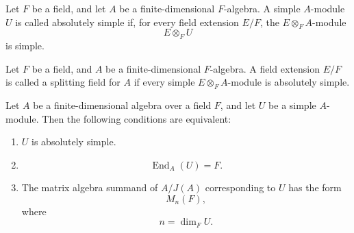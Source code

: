 \begin{definition}
    Let \(F\) be a field, and let \(A\) be a finite-dimensional \(F\)-algebra.
    A simple \(A\)-module \(U\) is called absolutely simple if, for every field
    extension \(E/F\), the \(E\otimes_F A\)-module
    \[
        E\otimes_F U
    \]
    is simple.
\end{definition}

\begin{definition}
    Let \(F\) be a field, and \(A\) be a finite-dimensional \(F\)-algebra.
    A field extension \(E/F\) is called a splitting field for \(A\) if every simple
    \(E\otimes_F A\)-module is absolutely simple.
\end{definition}

\begin{proposition}
    Let \(A\) be a finite-dimensional algebra over a field \(F\), and let \(U\) be
    a simple \(A\)-module. Then the following conditions are equivalent:
    \begin{enumerate}
        \item \(U\) is absolutely simple.
        \item
        \[
            \operatorname{End}_A(U)=F.
        \]
        \item The matrix algebra summand of \(A/J(A)\) corresponding to \(U\) has
        the form
        \[
            M_n(F),
        \]
        where
        \[
            n=\dim_F U.
        \]
    \end{enumerate}
\end{proposition}


